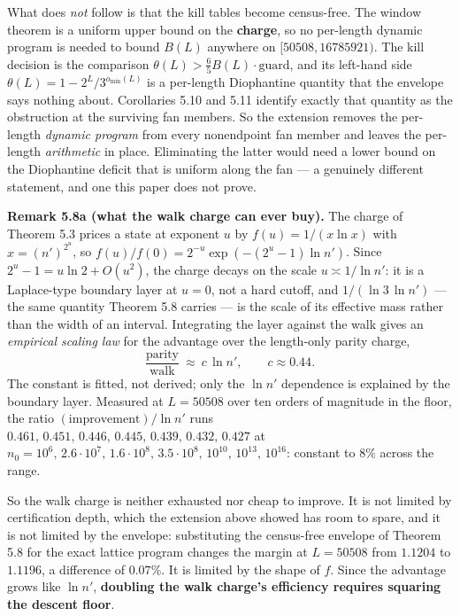 \documentclass[12pt]{article}
\begin{document}
What does \emph{not} follow is that the kill tables become census-free.
The window theorem is a uniform upper bound on the \textbf{charge}, so
no per-length dynamic program is needed to bound \(B(L)\) anywhere on
\([50508,16785921)\). The kill decision is the comparison
\(\theta(L)>\tfrac65B(L)\cdot\text{guard}\), and its left-hand side
\(\theta(L)=1-2^L/3^{o_{\min}(L)}\) is a per-length Diophantine quantity
that the envelope says nothing about. Corollaries 5.10 and 5.11 identify
exactly that quantity as the obstruction at the surviving fan members.
So the extension removes the per-length \emph{dynamic program} from
every nonendpoint fan member and leaves the per-length \emph{arithmetic}
in place. Eliminating the latter would need a lower bound on the
Diophantine deficit that is uniform along the fan --- a genuinely
different statement, and one this paper does not prove.

\textbf{Remark 5.8a (what the walk charge can ever buy).} The charge of
Theorem 5.3 prices a state at exponent \(u\) by \(f(u)=1/(x\ln x)\) with
\(x=(n')^{2^{u}}\), so \(f(u)/f(0)=2^{-u}\exp(-(2^{u}-1)\ln n')\). Since
\(2^{u}-1=u\ln2+O(u^{2})\), the charge decays on the scale
\(u\asymp1/\ln n'\): it is a Laplace-type boundary layer at \(u=0\), not
a hard cutoff, and \(1/(\ln3\,\ln n')\) --- the same quantity Theorem
5.8 carries --- is the scale of its effective mass rather than the width
of an interval. Integrating the layer against the walk gives an
\emph{empirical scaling law} for the advantage over the length-only
parity charge, \[
\frac{\text{parity}}{\text{walk}}\ \approx\ c\,\ln n',
\qquad c\approx0.44 .
\] The constant is fitted, not derived; only the \(\ln n'\) dependence
is explained by the boundary layer. Measured at \(L=50508\) over ten
orders of magnitude in the floor, the ratio
\((\text{improvement})/\ln n'\) runs
\(0.461,\,0.451,\,0.446,\,0.445,\,0.439,\,0.432,\,0.427\) at
\(n_0=10^{6},\,2.6\cdot10^{7},\,1.6\cdot10^{8},\,3.5\cdot10^{8},\,
10^{10},\,10^{13},\,10^{16}\): constant to \(8\%\) across the range.

So the walk charge is neither exhausted nor cheap to improve. It is not
limited by certification depth, which the extension above showed has
room to spare, and it is not limited by the envelope: substituting the
census-free envelope of Theorem 5.8 for the exact lattice program
changes the margin at \(L=50508\) from \(1.1204\) to \(1.1196\), a
difference of \(0.07\%\). It is limited by the shape of \(f\). Since the
advantage grows like \(\ln n'\), \textbf{doubling the walk charge's
efficiency requires squaring the descent floor}.
\end{document}
